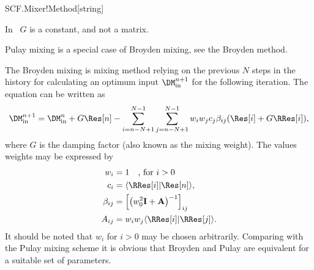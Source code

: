 \begin{fdfentry}{SCF.Mixer!Method}[string]
\begin{fdfoptions}
    In \siesta\ $G$ is a constant, and not a matrix.

    \note Pulay mixing is a special case of Broyden mixing, see the
    Broyden method.


    \option[Broyden] %
    The Broyden mixing is mixing method relying on the previous $N$
    steps in the history for calculating an optimum input
    $\DM^{n+1}_{\mathrm{in}}$ for the following iteration.  The
    equation can be written as
    \begin{equation}
      \DM^{n+1}_{\mathrm{in}} = \DM^n_{\mathrm{in}} + G \Res[n]
      - \sum_{i=n-N+1}^{N-1}\sum_{j=n-N+1}^{N-1} w_iw_j c_j \beta_{ij} (\Res[i] + G \RRes[i]),
    \end{equation}
    where $G$ is the damping factor (also known as
    the mixing weight).
    The values weights may be expressed by
    \begin{align}
      w_i &= 1 \quad\text{, for }i>0
      \\
      c_i &= \langle \RRes[i] | \Res[n] \rangle,
      \\
      \beta_{ij} &= \Big[\big(w_0^2\mathbf I + \mathbf
      A\big)^{-1}\Big]_{ij}
      \\
      A_{ij} &= w_iw_j \langle \RRes[i] | \RRes[j] \rangle.
    \end{align}
    It should be noted that $w_i$ for $i>0$ may be chosen arbitrarily.
    Comparing with the Pulay mixing scheme it is obvious that Broyden
    and Pulay are equivalent for a suitable set of parameters.

  \end{fdfoptions}
  
\end{fdfentry}

